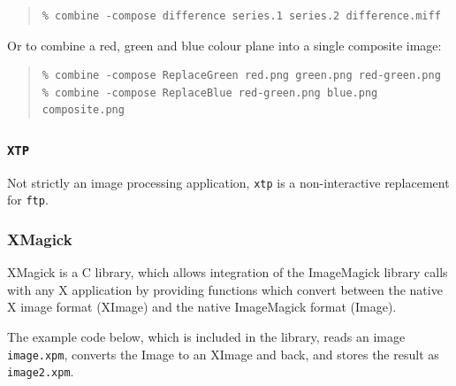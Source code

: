 \documentclass[twoside,11pt]{article}
\newcommand{\htmladdnormallink}[2]{#1}
\begin{document}
\small
\begin{quote}
\begin{verbatim}
% combine -compose difference series.1 series.2 difference.miff
\end{verbatim}
\end{quote}
\normalsize

Or to combine a red, green and blue colour plane into a single composite image:

\small
\begin{quote}
\begin{verbatim}
% combine -compose ReplaceGreen red.png green.png red-green.png 
% combine -compose ReplaceBlue red-green.png blue.png composite.png
\end{verbatim}
\end{quote}
\normalsize

\subsubsection{{\tt XTP}}
 
Not strictly an image processing application, {\tt xtp} is a non-interactive replacement for {\tt ftp}.    
    
\subsubsection{XMagick}

\htmladdnormallink{XMagick}{http://siag.nu/xmagick/} is a C library, which allows integration of the ImageMagick library calls with any X application by providing functions which convert between the native X image format (XImage) and the native ImageMagick format (Image).

The example code below, which is included in the library, reads an image {\tt image.xpm}, converts the Image to an XImage and back, and stores the result as {\tt image2.xpm}. 
\end{document}
